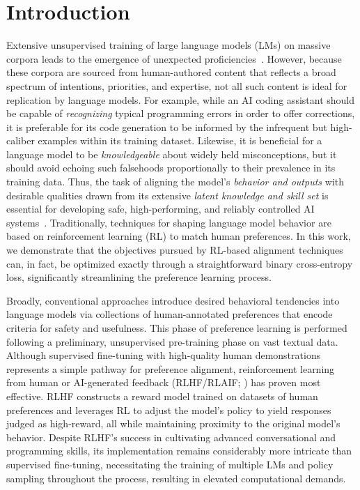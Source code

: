 \section{Introduction}
Extensive unsupervised training of large language models (LMs) on massive corpora leads to the emergence of unexpected proficiencies~\citep{chowdhery2022palm, brown2020language, touvron2023llama,bubeck2023sparks}. However, because these corpora are sourced from human-authored content that reflects a broad spectrum of intentions, priorities, and expertise, not all such content is ideal for replication by language models. For example, while an AI coding assistant should be capable of \textit{recognizing} typical programming errors in order to offer corrections, it is preferable for its code generation to be informed by the infrequent but high-caliber examples within its training dataset. Likewise, it is beneficial for a language model to be \textit{knowledgeable} about widely held misconceptions, but it should avoid echoing such falsehoods proportionally to their prevalence in its training data. Thus, the task of aligning the model's \emph{behavior and outputs} with desirable qualities drawn from its extensive \textit{latent knowledge and skill set} is essential for developing safe, high-performing, and reliably controlled AI systems~\citep{ouyang2022training}. Traditionally, techniques for shaping language model behavior are based on reinforcement learning (RL) to match human preferences. In this work, we demonstrate that the objectives pursued by RL-based alignment techniques can, in fact, be optimized exactly through a straightforward binary cross-entropy loss, significantly streamlining the preference learning process.

Broadly, conventional approaches introduce desired behavioral tendencies into language models via collections of human-annotated preferences that encode criteria for safety and usefulness. This phase of preference learning is performed following a preliminary, unsupervised pre-training phase on vast textual data. Although supervised fine-tuning with high-quality human demonstrations represents a simple pathway for preference alignment, reinforcement learning from human or AI-generated feedback (RLHF/RLAIF; \citep{christiano2017deep,bai2022constitutional}) has proven most effective. RLHF constructs a reward model trained on datasets of human preferences and leverages RL to adjust the model’s policy to yield responses judged as high-reward, all while maintaining proximity to the original model’s behavior. Despite RLHF's success in cultivating advanced conversational and programming skills, its implementation remains considerably more intricate than supervised fine-tuning, necessitating the training of multiple LMs and policy sampling throughout the process, resulting in elevated computational demands.

